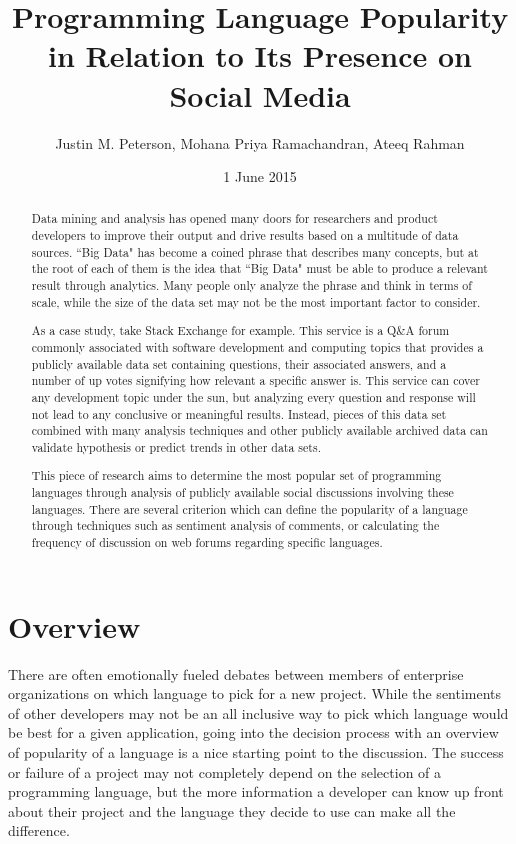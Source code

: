 \documentclass{sig-alternate}
\begin{document}
\title{Programming Language Popularity in Relation to Its Presence on Social Media}
\author{
\alignauthor
Justin M. Peterson,
Mohana Priya Ramachandran,
Ateeq Rahman
}
\date{1 June 2015}
\maketitle
\begin{abstract}

Data mining and analysis has opened many doors for researchers and product developers to improve their output and drive results based on a multitude of data sources. ``Big Data" has become a coined phrase that describes many concepts, but at the root of each of them is the idea that ``Big Data" must be able to produce a relevant result through analytics. Many people only analyze the phrase and think in terms of scale, while the size of the data set may not be the most important factor to consider. 

As a case study, take Stack Exchange \cite{iEEE:6542441} for example. This service is a Q\&A forum commonly associated with software development and computing topics that provides a publicly available data set containing questions, their associated answers, and a number of up votes signifying how relevant a specific answer is. This service can cover any development topic under the sun, but analyzing every question and response will not lead to any conclusive or meaningful results. Instead, pieces of this data set combined with many analysis techniques and other publicly available archived data can validate hypothesis or predict trends in other data sets. 

This piece of research aims to determine the most popular set of programming languages through analysis of publicly available social discussions involving these languages. There are several criterion which can define the popularity of a language through techniques such as sentiment analysis of comments, or calculating the frequency of discussion on web forums regarding specific languages. 

\end{abstract}

\section{Overview}
\label{overview}
There are often emotionally fueled debates between members of enterprise organizations on which language to pick for a new project. While the sentiments of other developers may not be an all inclusive way to pick which language would be best for a given application, going into the decision process with an overview of popularity of a language is a nice starting point to the discussion. The success or failure of a project may not completely depend on the selection of a programming language, but the more information a developer can know up front about their project and the language they decide to use can make all the difference.
\end{document}

